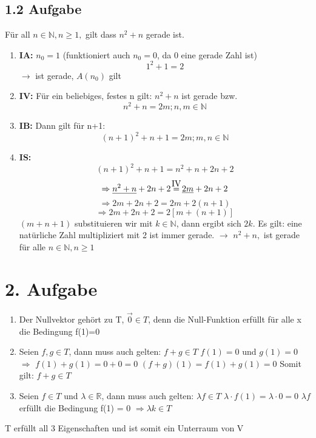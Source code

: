 \documentclass{report}
\newcommand\myeq{\stackrel{\mathclap{\normalfont\mbox{{IV}}}}{=}}
\begin{document}
\subsection*{1.2 Aufgabe}
Für all $n \in \mathbb N, n \geq 1,$ gilt dass $n^{2}+n$ gerade ist.

\begin{enumerate}
    \item \textbf{IA:} $n_0=1$ (funktioniert auch $n_0=0$, da 0 eine gerade Zahl ist)
        $$1^{2}+1 = 2 $$ $\rightarrow$ ist gerade, $A(n_0)$ gilt 
    \item \textbf{IV:} Für ein beliebiges, festes n gilt: $n^{2}+n$ ist 
        gerade bzw. $$n^{2}+n = 2m; n, m \in \mathbb N$$
    \item \textbf{IB:} Dann gilt für n+1:
        \[
            (n+1)^{2}+n+1 = 2m; m, n \in \mathbb N
        \]
    \item \textbf{IS:}
        $$(n+1)^{2}+n+1 = n^{2}+n+2n+2$$
        $$\Rightarrow \underline{n^{2}+n}+2n+2 \myeq \underline{2m}+2n+2$$
        $$\Rightarrow 2m+2n+2=2m+2(n+1)$$
        $$\Rightarrow 2m+2n+2=2[m+(n+1)]$$
        $(m+n+1)$ substituieren wir mit $k \in \mathbb N$,
        dann ergibt sich $2k$. Es gilt: eine natürliche Zahl
        multipliziert mit 2 ist immer gerade. \newline 
        $\rightarrow $ $n^{2}+n, $ ist gerade für alle $n\in \mathbb N, n\geq 1$

\end{enumerate}

\section*{2. Aufgabe}
\begin{enumerate}
    \item Der Nullvektor gehört zu T, $\vec{0} \in T$, 
        denn die Null-Funktion erfüllt für alle x die Bedingung f(1)=0
    \item Seien $f,g \in T$, dann muss auch gelten: $f+g \in T$
        \newline $f(1)=0$ und $g(1)=0$ $\Rightarrow$ $f(1)+g(1)=0+0=0$ \newline
        $(f+g)(1)= f(1)+g(1)= 0$ \newline
        Somit gilt: $f+g \in T$ 
    \item Seien $f \in T$ und $\lambda \in \mathbb R$, dann muss auch gelten: $\lambda f \in T$ \newline
        $\lambda \cdot f(1) = \lambda \cdot 0 = 0$ \newline
        $\lambda f$ erfüllt die Bedingung f(1) = 0 $\Rightarrow \lambda k \in T $ 
\end{enumerate}
T erfüllt all 3 Eigenschaften und ist somit ein Unterraum von V
\end{document}
